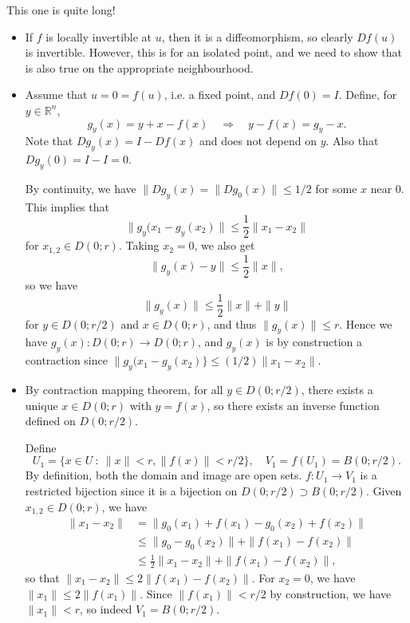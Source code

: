 \documentclass[letter-paper]{tufte-book}
\newenvironment{proof}[1][Proof]{\begin{trivlist}
\item[\hskip \labelsep {\bfseries #1}]}{\end{trivlist}}
\begin{document}
\begin{proof}
  This one is quite long!
  
  \begin{itemize}
    \item If $f$ is locally invertible at $u$, then it is a diffeomorphism, so
    clearly $Df(u)$ is invertible. However, this is for an isolated point, and
    we need to show that is also true on the appropriate neighbourhood.
    
    \item Assume that $u = 0 = f(u)$, i.e. a fixed point, and $Df(0) = I$.
    Define, for $y \in \mathbb{R}^n$,
    \begin{equation*}
      g_{y}(x) = y + x - f(x) \quad \Rightarrow \quad y - f(x) = g_{y} - x.
    \end{equation*}
    Note that $Dg_{y}(x) = I - Df(x)$ and does not depend on $y$. Also that
    $Dg_{y}(0) = I - I = 0$. 
    
    By continuity, we have $\|Dg_{y}(x) = \|Dg_{0}(x)\| \leq 1/2$
    for some $x$ near $0$. This implies that
    \begin{equation*}
      \|g_{y}(x_1 - g_{y}(x_2)\| \leq \frac{1}{2}\|x_1 - x_2\|
    \end{equation*}
    for $x_{1,2} \in D(0; r)$. Taking $x_2 = 0$, we also get
    \begin{equation*}
      \|g_{y}(x) - y\| \leq \frac{1}{2}\|x\|,
    \end{equation*}
    so we have
    \begin{equation*}
      \|g_{y}(x)\| \leq \frac{1}{2}\|x\| + \|y\|
    \end{equation*}
    for $y \in D(0; r/2)$ and $x \in D(0; r)$, and thus $\|g_{y}(x)\| \leq r$.
    Hence we have $g_{y}(x) : D(0; r) \to D(0; r)$, and $g_{y}(x)$ is by
    construction a contraction since $\|g_{y}(x_1 - g_{y}(x_2)\} \leq (1/2)\|x_1
    - x_2\|$.
  
    \item By contraction mapping theorem, for all $y \in D(0; r/2)$, there
    exists a unique $x \in D(0; r)$ with $y = f(x)$, so there exists an inverse
    function defined on $D(0; r/2)$.
    
    Define
    \begin{equation*}
      U_1 = \{x \in U\ :\ \|x\| < r, \|f(x)\| < r/2\}, \quad V_1 = f(U_1) = B(0; r/2).
    \end{equation*}
    By definition, both the domain and image are open sets. $f : U_1 \to V_1$ is
    a restricted bijection since it is a bijection on $D(0; r/2) \supset B(0;
    r/2)$. Given $x_{1,2} \in D(0; r)$, we have
    \begin{align*}
      \|x_1 - x_2\| &= \| g_{0}(x_1) + f(x_1) - g_{0}(x_2) + f(x_2)\| \\
        & \leq \|g_{0} - g_{0}(x_2)\| + \|f(x_1) - f(x_2)\| \\
        & \leq \frac{1}{2} \|x_1 - x_2\| + \|f(x_1) - f(x_2)\|,
    \end{align*}
    so that $\|x_1 - x_2\| \leq 2\|f(x_1) - f(x_2)\|$. For $x_2 = 0$, we have
    $\|x_1\| \leq 2\|f(x_1)\|$. Since $\|f(x_1)\| < r/2$ by construction, we
    have $\|x_1\| < r$, so indeed $V_1 = B(0; r/2)$.
    

\end{itemize}
\end{proof}
\end{document}
